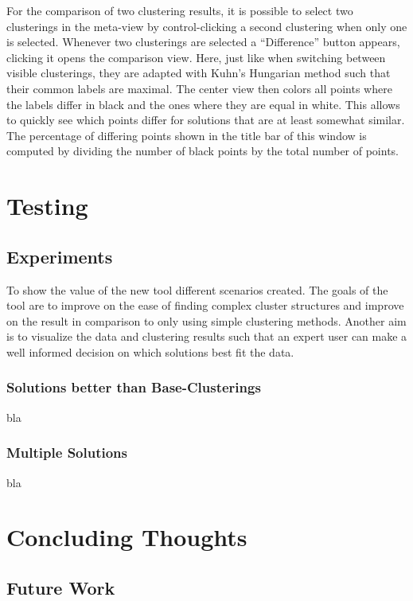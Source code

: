 \documentclass[
	a4paper,
	english,
	twoside,
	openright,               
	11pt                            
	]{report}
\begin{document}
For the comparison of two clustering results, it is possible to select two clusterings in the meta-view by control-clicking a second clustering when only one is selected. Whenever two clusterings are selected a ``Difference'' button appears, clicking it opens the comparison view. Here, just like when switching between visible clusterings, they are adapted with Kuhn’s Hungarian method \cite{Kuhn2010} such that their common labels are maximal. The center view then colors all points where the labels differ in black and the ones where they are equal in white. This allows to quickly see which points differ for solutions that are at least somewhat similar. The percentage of differing points shown in the title bar of this window is computed by dividing the number of black points by the total number of points.

\part{Testing}
\chapter{Experiments}\label{cha:experiments}
To show the value of the new tool different scenarios created. The goals of the tool are to improve on the ease of finding complex cluster structures and improve on the result in comparison to only using simple clustering methods. Another aim is to visualize the data and clustering results such that an expert user can make a well informed decision on which solutions best fit the data.
\section{Solutions better than Base-Clusterings}
bla

\section{Multiple Solutions}
bla



\part{Concluding Thoughts}

\chapter{Future Work}\label{cha:futurework}
\end{document}
